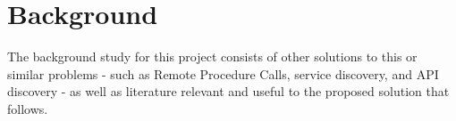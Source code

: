 \section{Background} \label{bg}

The background study for this project consists of other solutions to this or similar problems - such as Remote Procedure Calls, service discovery, and API discovery - as well as literature relevant and useful to the proposed solution that follows.





